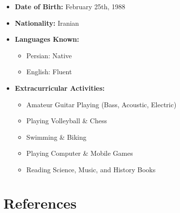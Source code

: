 \documentclass{cv}
\begin{document}
\begin{itemize}

\item
\textbf{Date of Birth:}
February 25th, 1988


\item
{\bf Nationality:}
Iranian

\item
\textbf{Languages Known:}
\begin{itemize}

\item
Persian: Native

\item
English: Fluent
%
\end{itemize}

\item
\textbf{Extracurricular Activities:}

\begin{itemize}
\item
Amateur Guitar Playing (Bass, Acoustic, Electric)
\item
Playing Volleyball \& Chess
\item
Swimming \& Biking
\item
Playing Computer \& Mobile Games
\item
Reading Science, Music, and History Books
\end{itemize} 


\end{itemize}


\section{References}
\end{document}
